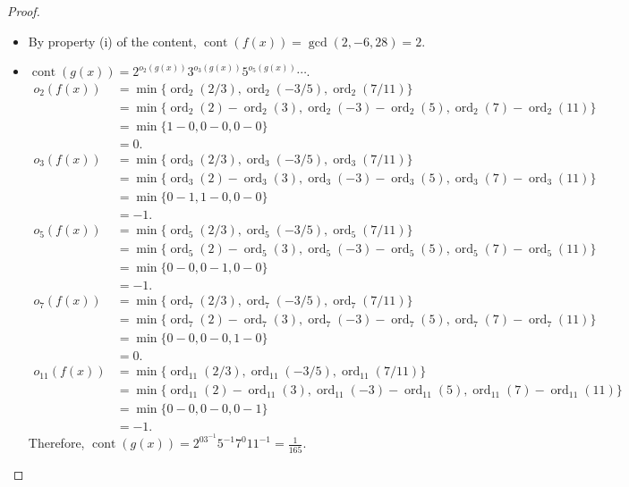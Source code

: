 \documentclass[12pt, psamsfonts]{amsart}
\theoremstyle{definition}
\theoremstyle{remark}
\DeclareMathOperator{\cont}{cont}
\DeclareMathOperator{\ord}{ord}
\numberwithin{equation}{section}
\begin{document}
\begin{proof}
  $ $
  \begin{itemize}
    \item
      By property (i) of the content, $\cont(f(x)) = \gcd(2, -6, 28) = 2$.
    \item
      $\cont(g(x)) = 2^{o_2(g(x))}3^{o_3(g(x))}5^{o_5(g(x))}\cdots$.
      \begin{align*}
        o_2(f(x))
          &= \min \{ \ord_2(2/3), \ord_2(-3/5), \ord_2(7/11) \} \\
          &= \min \{ \ord_2(2) - \ord_2(3), \ord_2(-3) - \ord_2(5), \ord_2(7) - \ord_2(11) \} \\
          &= \min \{ 1 - 0, 0 - 0, 0 - 0 \} \\
          &= 0. \\
        o_3(f(x))
          &= \min \{ \ord_3(2/3), \ord_3(-3/5), \ord_3(7/11) \} \\
          &= \min \{ \ord_3(2) - \ord_3(3), \ord_3(-3) - \ord_3(5), \ord_3(7) - \ord_3(11) \} \\
          &= \min \{ 0 - 1, 1 - 0, 0 - 0 \} \\
          &= -1. \\
        o_5(f(x))
          &= \min \{ \ord_5(2/3), \ord_5(-3/5), \ord_5(7/11) \} \\
          &= \min \{ \ord_5(2) - \ord_5(3), \ord_5(-3) - \ord_5(5), \ord_5(7) - \ord_5(11) \} \\
          &= \min \{ 0 - 0, 0 - 1, 0 - 0 \} \\
          &= -1. \\
        o_7(f(x))
          &= \min \{ \ord_7(2/3), \ord_7(-3/5), \ord_7(7/11) \} \\
          &= \min \{ \ord_7(2) - \ord_7(3), \ord_7(-3) - \ord_7(5), \ord_7(7) - \ord_7(11) \} \\
          &= \min \{ 0 - 0, 0 - 0, 1 - 0 \} \\
          &= 0. \\
        o_{11}(f(x))
          &= \min \{ \ord_{11}(2/3), \ord_{11}(-3/5), \ord_{11}(7/11) \} \\
          &= \min \{ \ord_{11}(2) - \ord_{11}(3), \ord_{11}(-3) - \ord_{11}(5), \ord_{11}(7) - \ord_{11}(11) \} \\
          &= \min \{ 0 - 0, 0 - 0, 0 - 1 \} \\
          &= -1.
      \end{align*}
      Therefore, $\cont(g(x)) = 2^03^{-1}5^{-1}7^{0}11^{-1} = \frac{1}{165}$.
  \end{itemize}
\end{proof}
\end{document}
